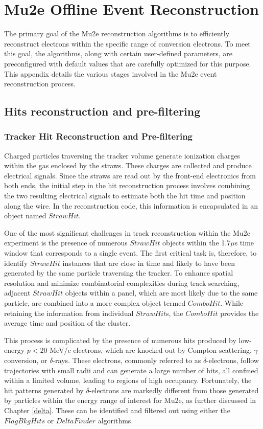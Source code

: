 
\chapter{Mu2e Offline Event Reconstruction}\label{eventreco}

The primary goal of the Mu2e reconstruction algorithms is 
to efficiently reconstruct electrons within the specific range 
of conversion electrons. To meet this goal, the algorithms, 
along with certain user-defined parameters, are preconfigured 
with default values that are carefully optimized for this purpose. 
This appendix details the various stages involved in the Mu2e event reconstruction process.

\section{Hits reconstruction and pre-filtering}
\subsection{Tracker Hit Reconstruction and Pre-filtering}
Charged particles traversing the tracker volume generate 
ionization charges within the gas enclosed by the straws. 
These charges are collected and produce electrical signals. 
Since the straws are read out by the front-end electronics from 
both ends, the initial step in the hit reconstruction process 
involves combining the two resulting electrical signals to 
estimate both the hit time and position along the wire. In the 
reconstruction code, this information is encapsulated in an object named $StrawHit$.

One of the most significant challenges in track reconstruction within 
the Mu2e experiment is the presence of numerous $StrawHit$ 
objects within the 1.7$\mu$s time window that corresponds to 
a single event. The first critical task is, therefore, to identify 
$StrawHit$ instances that are close in time and likely to 
have been generated by the same particle traversing the tracker. To 
enhance spatial resolution and minimize combinatorial complexities 
during track searching, adjacent $StrawHit$ objects within a 
panel, which are most likely due to the same particle, are combined 
into a more complex object termed $ComboHit$. While retaining 
the information from individual $StrawHit$s, the $ComboHit$ provides the average time and position of the cluster.

This process is complicated by the presence of numerous hits produced 
by low-energy $p < 20$ MeV/c electrons, which are knocked 
out by Compton scattering, $\gamma$ conversion, or $\delta$-rays. 
These electrons, commonly referred to as $\delta$-electrons, follow 
trajectories with small radii and can generate a large number of hits, 
all confined within a limited volume, leading to regions of high occupancy. 
Fortunately, the hit patterns generated by $\delta$-electrons are markedly 
different from those generated by particles within the energy range of 
interest for Mu2e, as further discussed in Chapter \ref{delta}. These can be 
identified and filtered out using either the $FlagBkgHits$ or $DeltaFinder$ algorithms.

